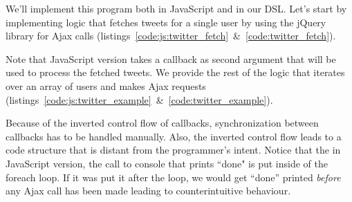 \documentclass[runningheads,a4paper]{llncs}
\begin{document}
We'll implement this program both in JavaScript and in our DSL. Let's start by implementing logic that fetches tweets for a single user by using the jQuery library for Ajax calls (listings~\ref{code:js:twitter_fetch}~\&~\ref{code:twitter_fetch}).

\lstset{basicstyle=\ttfamily\scriptsize}
\begin{figure}
\setlength{\columnseprule}{0.5pt}
\begin{changemargin}{-1.5cm}{-1.5cm}
\begin{multicols}{2}


\end{multicols}
\end{changemargin}
\end{figure}

Note that JavaScript version takes a callback as second argument that will be used to process the fetched tweets. We provide the rest of the logic that iterates over an array of users and makes Ajax requests (listings~\ref{code:js:twitter_example}~\&~\ref{code:twitter_example}).

\begin{figure}
\begin{changemargin}{-0.7cm}{-0.7cm}
\setlength{\columnseprule}{0.5pt}
\begin{multicols}{2}


\end{multicols}
\end{changemargin}
\end{figure}

\lstset{basicstyle=\ttfamily}

Because of the inverted control flow of callbacks, synchronization between callbacks has to be handled manually. Also, the inverted control flow leads to a code structure that is distant from the programmer's intent. Notice that the in JavaScript version, the call to console that prints ``done" is put inside of the foreach loop. If it was put it after the loop, we would get ``done'' printed \emph{before} any Ajax call has been made leading to counterintuitive behaviour.
\end{document}
